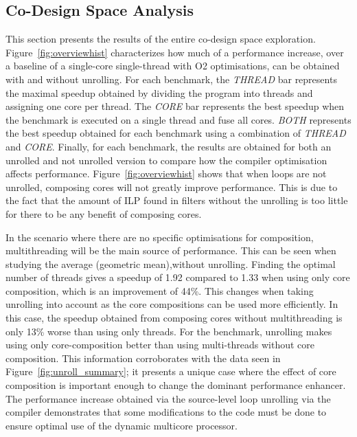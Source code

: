 \subsection{Co-Design Space Analysis}


This section  presents the results of the entire co-design space exploration.
Figure~\ref{fig:overviewhist} characterizes how much of a performance increase, over a baseline of a single-core single-thread with O2 optimisations, can be obtained with and without unrolling.
For each benchmark, the \textit{THREAD} bar represents the maximal speedup obtained by dividing the program into threads and assigning one core per thread.
The \textit{CORE} bar represents the best speedup when the benchmark is executed on a single thread and fuse all cores.
\textit{BOTH} represents the best speedup obtained for each benchmark using a combination of \textit{THREAD} and \textit{CORE}.
Finally, for each benchmark, the results are obtained for both an unrolled and not unrolled version to compare how the compiler optimisation affects performance.
Figure~\ref{fig:overviewhist} shows that when loops are not unrolled, composing cores will not greatly improve performance.
This is due to the fact that the amount of ILP found in filters without the unrolling is too little for there to be any benefit of composing cores.

In the scenario where there are no specific optimisations for composition, multithreading will be the main source of performance.
This can be seen when studying the average (geometric mean),without unrolling.
Finding the optimal number of threads gives a speedup of 1.92 compared to 1.33 when using only core composition, which is an improvement of 44\%.
This changes when taking unrolling into account as the core compositions can be used more efficiently.
In this case, the speedup obtained from composing cores without multithreading is only 13\% worse than using only threads.
For the  benchmark, unrolling makes using only core-composition better than using multi-threads without core composition.
This information corroborates with the data seen in Figure~\ref{fig:unroll_summary}; it presents a unique case where the effect of core composition is important enough to change the dominant performance enhancer.
The performance increase obtained via the source-level loop unrolling via the compiler demonstrates that some modifications to the code must be done to ensure optimal use of the dynamic multicore processor.

